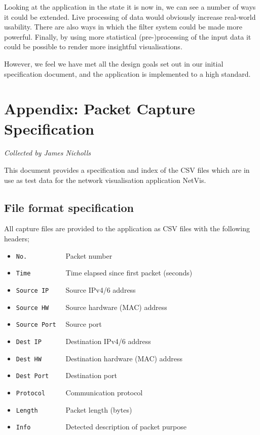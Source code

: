 \documentclass[12pt,a4paper]{article}
\begin{document}
        Looking at the application in the state it is now in, we can see a number of ways it could be extended. Live processing of data would obviously increase real-world usability. There are also ways in which the filter system could be made more powerful. Finally, by using more statistical (pre-)processing of the input data it could be possible to render more insightful visualisations.
        
        However, we feel we have met all the design goals set out in our initial specification document, and the application is implemented to a high standard.
        
	
	\newpage
	\section*{Appendix: Packet Capture Specification}
	
	\textit{Collected by James Nicholls}
	
	This document provides a specification and index of the CSV files
	which are in use as test data for the network visualisation
	application NetVis.
	
	\subsection*{File format specification}
	All capture files are provided to the application as CSV files
	with the following headers;
	
	\begin{itemize}
		\setlength{\itemsep}{0pt}
		\item \verb!No.          ! Packet number
		\item \verb!Time         ! Time elapsed since first packet (seconds)
		\item \verb!Source IP    ! Source IPv4/6 address
		\item \verb!Source HW    ! Source hardware (MAC) address
		\item \verb!Source Port  ! Source port
		\item \verb!Dest IP      ! Destination IPv4/6 address
		\item \verb!Dest HW      ! Destination hardware (MAC) address
		\item \verb!Dest Port    ! Destination port
		\item \verb!Protocol     ! Communication protocol
		\item \verb!Length       ! Packet length (bytes)
		\item \verb!Info         ! Detected description of packet purpose
	\end{itemize}
	
\end{document}
